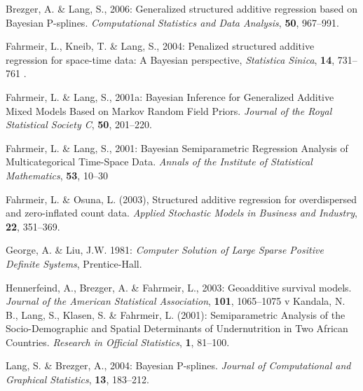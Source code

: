 \documentclass[a4paper]{article}
\begin{document}
\begin{thebibliography}{99}
 Brezger, A. \& Lang,
S., 2006: Generalized structured additive regression based on
Bayesian P-splines. {\it Computational Statistics and Data
Analysis}, {\bf 50}, 967--991.

 Fahrmeir, L., Kneib,
T. \& Lang, S., 2004: Penalized structured additive regression for
space-time data: A Bayesian perspective, {\it Statistica Sinica},
{\bf 14}, 731--761 .

 Fahrmeir, L. \&
Lang, S., 2001a: Bayesian Inference for Generalized Additive Mixed
Models Based on Markov Random Field Priors. {\it Journal of the
Royal Statistical Society C}, {\bf 50}, 201--220.

 Fahrmeir, L. \&
Lang, S., 2001: Bayesian Semiparametric Regression Analysis of
Multicategorical Time-Space Data. {\it Annals of the Institute of
Statistical Mathematics}, {\bf 53}, 10--30

 Fahrmeir, L. \&
Osuna, L. (2003), Structured additive regression for overdispersed and zero-inflated count data.
{\it Applied Stochastic Models in Business and Industry}, {\bf 22}, 351--369.

 George, A. \& Liu,
J.W. 1981: {\it Computer Solution of Large Sparse Positive
Definite Systems}, Prentice-Hall.

 Hennerfeind, A.,
Brezger, A. \& Fahrmeir, L., 2003: Geoadditive survival models.
{\it Journal of the American Statistical Association}, {\bf 101}, 1065--1075
v Kandala, N. B., Lang,
S., Klasen, S. \& Fahrmeir, L. (2001): Semiparametric Analysis of
the Socio-Demographic and Spatial Determinants of Undernutrition
in Two African Countries. {\it Research in Official Statistics},
{\bf 1}, 81--100.

 Lang, S. \& Brezger,
A., 2004: Bayesian P-splines. {\it Journal of Computational and
Graphical Statistics}, {\bf 13}, 183--212.

\end{thebibliography}
\end{document}
